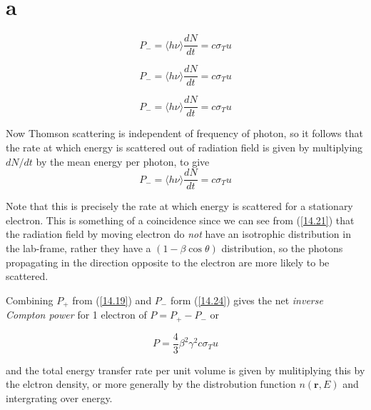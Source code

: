 \documentclass[a4paper,11pt,twoside]{article}
\begin{document}
    \section{a}

    \begin{equation}
    \label{14.21}
    P_{-} = \langle h\nu \rangle \frac{d N}{dt} = c\sigma_{T} u
    \tag{14.21}
    \end{equation}

    \begin{equation}
    \label{14.7}
    P_{-} = \langle h\nu \rangle \frac{d N}{dt} = c\sigma_{T} u
    \tag{14.7}
    \end{equation}

    \begin{equation}
    \label{14.19}
    P_{-} = \langle h\nu \rangle \frac{d N}{dt} = c\sigma_{T} u
    \tag{14.19}
    \end{equation}

    \newpage

    Now Thomson scattering is independent of frequency of photon, so it follows that the rate at which
    energy is scattered out of radiation field is given by multiplying $dN/dt$ by the mean energy per
    photon, to give
    \begin{equation}
    \label{14.24}
    P_{-} = \langle h\nu \rangle \frac{d N}{dt} = c\sigma_{T} u
    \tag{14.24}
    \end{equation}

    Note that this is precisely the rate at which energy is scattered for a stationary electron. This is
    something of a coincidence since we can see from (\ref{14.21}) that the radiation field by moving
    electron do \textit{not} have an isotrophic distribution in the lab-frame, rather they have a $( 1-
    \beta \cos \theta)$ distribution, so the photons propagating in the direction opposite to the electron
    are more likely to be scattered.

    Combining $P_{+} $ from (\ref{14.19}) and $ P_{-}$ form (\ref{14.24}) gives the net
    \textit{inverse Compton power} for 1 electron of $ P = P_+ - P_- $ or

    \begin{equation}
    \label{14.25}
    P = \frac{4}{3} \beta^2 \gamma^2 c \sigma_{T} u
    \tag{14.25}
    \end{equation}

    and the total energy transfer rate per unit volume is given by mulitiplying this by the elctron density,
    or more generally by the distrobution function $ n(\textbf{r},E)$ and intergrating over energy.
\end{document}
